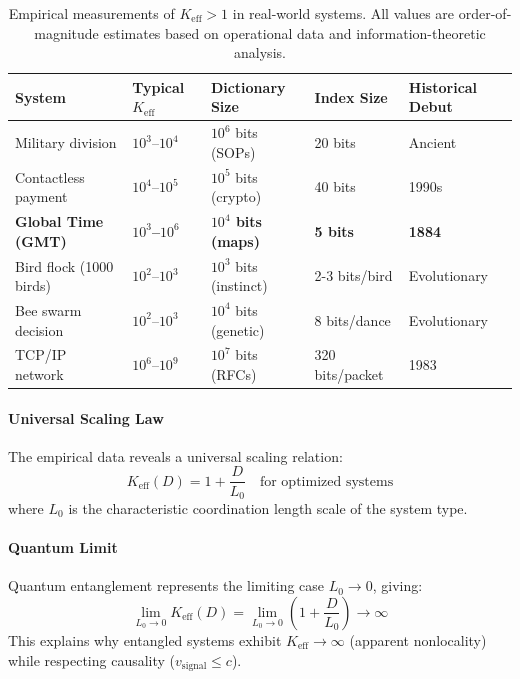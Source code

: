 \documentclass[11pt,a4paper]{article}
\begin{document}
	\begin{table}[htbp]
		\centering
		\small
		\begin{tabular}{p{}p{}p{}p{}p{}}
			\toprule
			\textbf{System} & \textbf{Typical $K_{\mathrm{eff}}$} & \textbf{Dictionary Size} & \textbf{Index Size} & \textbf{Historical Debut} \\
			\midrule
			Military division & $10^3$--$10^4$ & $10^6$ bits (SOPs) & 20 bits & Ancient \\
			Contactless payment & $10^4$--$10^5$ & $10^5$ bits (crypto) & 40 bits & 1990s \\
			\textbf{Global Time (GMT)} & \textbf{$10^3$--$10^6$} & \textbf{$10^4$ bits (maps)} & \textbf{5 bits} & \textbf{1884} \\
			Bird flock (1000 birds) & $10^2$--$10^3$ & $10^3$ bits (instinct) & 2-3 bits/bird & Evolutionary \\
			Bee swarm decision & $10^2$--$10^3$ & $10^4$ bits (genetic) & 8 bits/dance & Evolutionary \\
			TCP/IP network & $10^6$--$10^9$ & $10^7$ bits (RFCs) & 320 bits/packet & 1983 \\
			\bottomrule
		\end{tabular}
		\caption{Empirical measurements of $K_{\mathrm{eff}} > 1$ in real-world systems. All values are order-of-magnitude estimates based on operational data and information-theoretic analysis.}
		\label{tab:empirical-keff}
	\end{table}
	
	\paragraph{Universal Scaling Law}
	The empirical data reveals a universal scaling relation:
	\begin{equation}
		\boxed{K_{\mathrm{eff}}(D) = 1 + \frac{D}{L_0} \quad \text{for optimized systems}}
	\end{equation}
	where $L_0$ is the characteristic coordination length scale of the system type.
	
	\paragraph{Quantum Limit}
	Quantum entanglement represents the limiting case $L_0 \to 0$, giving:
	\begin{equation}
		\lim_{L_0 \to 0} K_{\mathrm{eff}}(D) = \lim_{L_0 \to 0} \left(1 + \frac{D}{L_0}\right) \to \infty
	\end{equation}
	This explains why entangled systems exhibit $K_{\mathrm{eff}} \to \infty$ 
	(apparent nonlocality) while respecting causality ($v_{\text{signal}} \leq c$).
	
\end{document}

